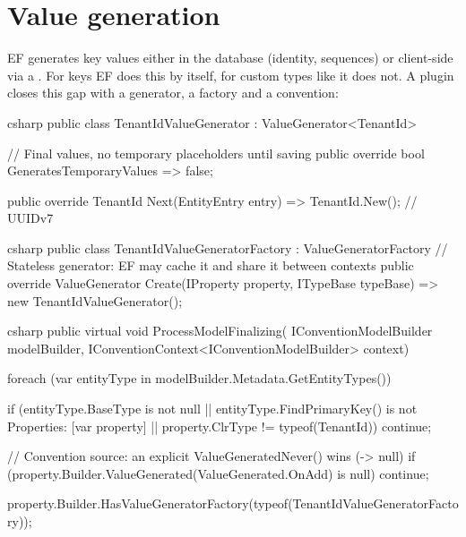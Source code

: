 \chapter{Value generation}\label{ch:value-generation}

EF generates key values either in the database (identity, sequences) or client-side via a
. For  keys EF does this by itself, for custom
types like  it does not. A plugin closes this gap with a
generator, a factory and a convention:

\begin{sourcecode}{csharp}
public class TenantIdValueGenerator : ValueGenerator<TenantId>
{
    // Final values, no temporary placeholders until saving
    public override bool GeneratesTemporaryValues => false;

    public override TenantId Next(EntityEntry entry) => TenantId.New();   // UUIDv7
}
\end{sourcecode}

\begin{sourcecode}{csharp}
public class TenantIdValueGeneratorFactory : ValueGeneratorFactory
{
    // Stateless generator: EF may cache it and share it between contexts
    public override ValueGenerator Create(IProperty property, ITypeBase typeBase)
        => new TenantIdValueGenerator();
}
\end{sourcecode}

\begin{sourcecode}{csharp}
public virtual void ProcessModelFinalizing(
    IConventionModelBuilder modelBuilder,
    IConventionContext<IConventionModelBuilder> context)
{
    foreach (var entityType in modelBuilder.Metadata.GetEntityTypes())
    {
        if (entityType.BaseType is not null
            || entityType.FindPrimaryKey() is not { Properties: [var property] }
            || property.ClrType != typeof(TenantId))
            continue;

        // Convention source: an explicit ValueGeneratedNever() wins (-> null)
        if (property.Builder.ValueGenerated(ValueGenerated.OnAdd) is null)
            continue;

        property.Builder.HasValueGeneratorFactory(typeof(TenantIdValueGeneratorFactory));
    }
}
\end{sourcecode}

